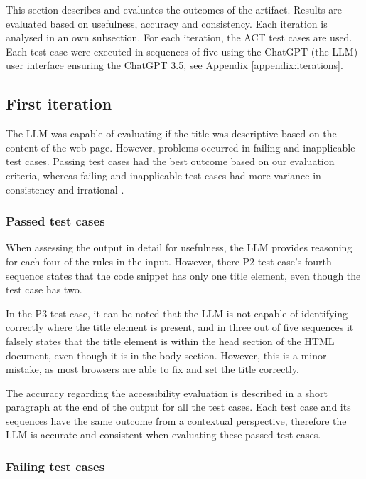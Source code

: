 This section describes and evaluates the outcomes of the artifact. Results are evaluated based on usefulness, accuracy and consistency. Each iteration is analysed in an own subsection. For each iteration, the \textcite{act_rule_g88} ACT test cases are used. Each test case were executed in sequences of five using the ChatGPT (the LLM) user interface ensuring the ChatGPT 3.5, see Appendix \ref{appendix:iterations}.

\subsection{First iteration}

The LLM was capable of evaluating if the title was descriptive based on the content of the web page. However, problems occurred in failing and inapplicable test cases. Passing test cases had the best outcome based on our evaluation criteria, whereas failing and inapplicable test cases had more variance in consistency and irrational .

\subsubsection{Passed test cases}

When assessing the output in detail for usefulness, the LLM provides reasoning for each four of the rules in the input. However, there P2 test case's fourth sequence states that the code snippet has only one title element, even though the test case has two. 

In the P3 test case, it can be noted that the LLM is not capable of identifying correctly where the title element is present, and in three out of five sequences it falsely states that the title element is within the head section of the HTML document, even though it is in the body section. However, this is a minor mistake, as most browsers are able to fix and set the title correctly.

The accuracy regarding the accessibility evaluation is described in a short paragraph at the end of the output for all the test cases. Each test case and its sequences have the same outcome from a contextual perspective, therefore the LLM is accurate and consistent when evaluating these passed test cases.

\subsubsection{Failing test cases}

